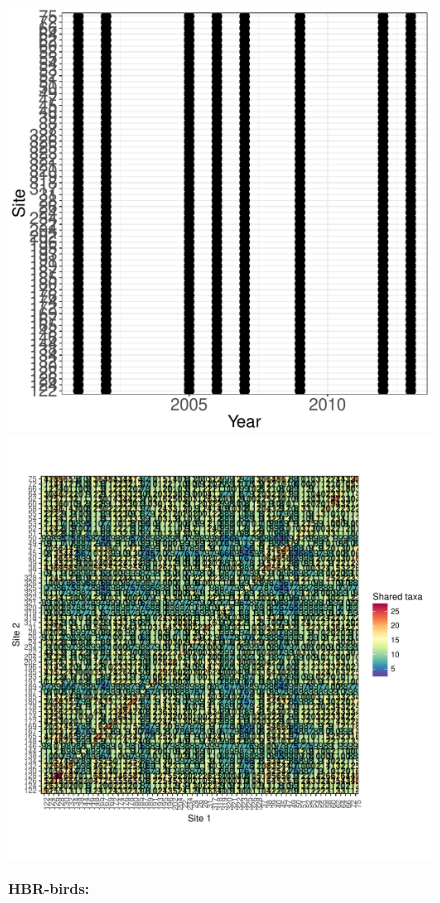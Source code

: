 \documentclass[11pt, oneside]{article}
\begin{document}
\begin{figure}[h!]
\includegraphics[scale = 0.4]{hbr-birds-sillett_spatiotemporal_sampling_effort.pdf}
\includegraphics[scale = 0.4]{hbr-birds-sillett_spp_shared.pdf}
\caption{{\bf HBR-birds:} }
\label{hbr-birds}
\end{figure}
\end{document}
